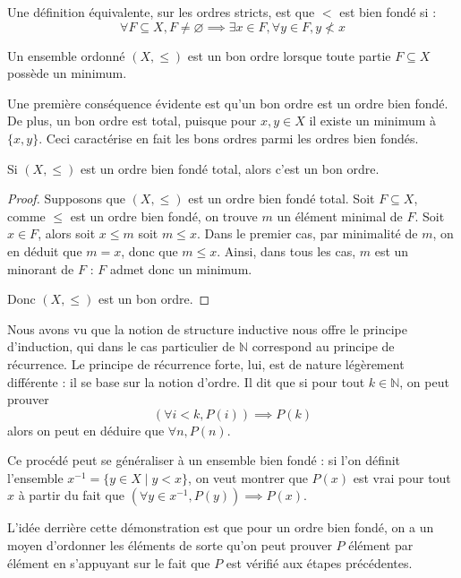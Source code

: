 \begin{remark}
  Une définition équivalente, sur les ordres stricts, est que $<$ est bien fondé
  si :
  \[\forall F \subseteq X, F\neq \varnothing \implies \exists x \in F,
  \forall y \in F, y\nless x\]
\end{remark}

\begin{definition}
  Un ensemble ordonné $(X,\leq)$ est un bon ordre lorsque toute partie
  $F\subseteq X$ possède un minimum.
\end{definition}

Une première conséquence évidente est qu'un bon ordre est un ordre bien fondé.
De plus, un bon ordre est total, puisque pour $x,y\in X$ il existe un minimum
à $\{x,y\}$. Ceci caractérise en fait les bons ordres parmi les ordres bien
fondés.

\begin{proposition}
  Si $(X,\leq)$ est un ordre bien fondé total, alors c'est un bon ordre.
\end{proposition}

\begin{proof}
  Supposons que $(X,\leq)$ est un ordre bien fondé total. Soit $F\subseteq X$,
  comme $\leq$ est un ordre bien fondé, on trouve $m$ un élément minimal de $F$.
  Soit $x\in F$, alors soit $x \leq m$ soit $m\leq x$. Dans le premier cas,
  par minimalité de $m$, on en déduit que $m = x$, donc que $m\leq x$. Ainsi,
  dans tous les cas, $m$ est un minorant de $F$ : $F$ admet donc un minimum.

  Donc $(X,\leq)$ est un bon ordre.
\end{proof}

Nous avons vu que la notion de structure inductive nous offre le principe
d'induction, qui dans le cas particulier de $\mathbb N$ correspond au principe
de récurrence. Le principe de récurrence forte, lui, est de nature légèrement
différente : il se base sur la notion d'ordre. Il dit que si pour tout
$k\in\mathbb N$, on peut prouver
\[(\forall i < k, P(i)) \implies P(k)\]
alors on peut en déduire que $\forall n, P(n)$.

Ce procédé peut se généraliser à un ensemble bien fondé : si l'on définit
l'ensemble
$x^{-1} = \{y \in X \mid y < x\}$, on veut montrer que $P(x)$ est vrai pour tout
$x$ à partir du fait que $(\forall y \in x^{-1}, P(y)) \implies P(x)$.

L'idée derrière cette démonstration est que pour un ordre bien fondé, on a un
moyen d'ordonner les éléments de sorte qu'on peut prouver $P$ élément par
élément en s'appuyant sur le fait que $P$ est vérifié aux étapes précédentes.


